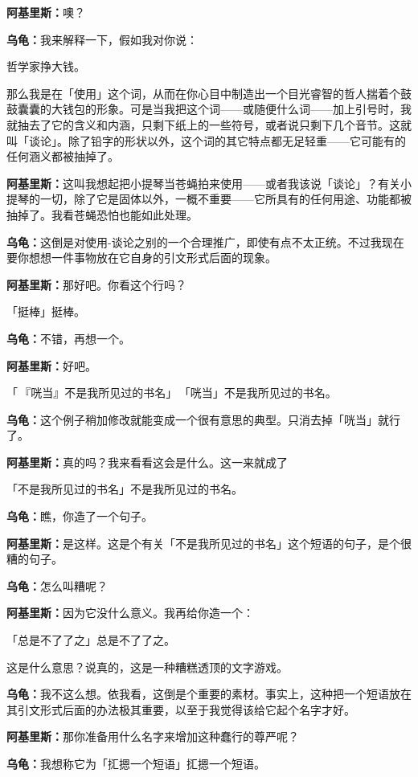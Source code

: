 \documentclass[
  12pt,
  twoside,
  openright,
  oldfontcommands,
]{memoir}
\newcommand{\dialogname}[1]{{\heifamily\bfseries #1}}
\begin{document}
\dialogname{阿基里斯：}噢？

\dialogname{乌龟：}我来解释一下，假如我对你说：

哲学家挣大钱。

那么我是在「使用」这个词，从而在你心目中制造出一个目光睿智的哲人揣着个鼓鼓囊囊的大钱包的形象。可是当我把这个词------或随便什么词------加上引号时，我就抽去了它的含义和内涵，只剩下纸上的一些符号，或者说只剩下几个音节。这就叫「谈论」。除了铅字的形状以外，这个词的其它特点都无足轻重------它可能有的任何涵义都被抽掉了。

\dialogname{阿基里斯：}这叫我想起把小提琴当苍蝇拍来使用------或者我该说「谈论」？有关小提琴的一切，除了它是固体以外，一概不重要------它所具有的任何用途、功能都被抽掉了。我看苍蝇恐怕也能如此处理。

\dialogname{乌龟：}这倒是对使用-谈论之别的一个合理推广，即使有点不太正统。不过我现在要你想想一件事物放在它自身的引文形式后面的现象。

\dialogname{阿基里斯：}那好吧。你看这个行吗？

「挺棒」挺棒。

\dialogname{乌龟：}不错，再想一个。

\dialogname{阿基里斯：}好吧。

「\,『咣当』不是我所见过的书名」\,「咣当」不是我所见过的书名。

\dialogname{乌龟：}这个例子稍加修改就能变成一个很有意思的典型。只消去掉「咣当」就行了。

\dialogname{阿基里斯：}真的吗？我来看看这会是什么。这一来就成了

「不是我所见过的书名」不是我所见过的书名。

\dialogname{乌龟：}瞧，你造了一个句子。

\dialogname{阿基里斯：}是这样。这是个有关「不是我所见过的书名」这个短语的句子，是个很糟的句子。

\dialogname{乌龟：}怎么叫糟呢？

\dialogname{阿基里斯：}因为它没什么意义。我再给你造一个：

「总是不了了之」总是不了了之。

这是什么意思？说真的，这是一种糟糕透顶的文字游戏。

\dialogname{乌龟：}我不这么想。依我看，这倒是个重要的素材。事实上，这种把一个短语放在其引文形式后面的办法极其重要，以至于我觉得该给它起个名字才好。

\dialogname{阿基里斯：}那你准备用什么名字来增加这种蠢行的尊严呢？

\dialogname{乌龟：}我想称它为「㧟摁一个短语」㧟摁一个短语。
\end{document}
